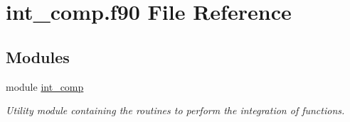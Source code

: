 \hypertarget{int__comp_8f90}{}\section{int\+\_\+comp.\+f90 File Reference}
\label{int__comp_8f90}
\subsection*{Modules}
\begin{DoxyCompactItemize}
\item 
module \hyperlink{namespaceint__comp}{int\+\_\+comp}
\begin{DoxyCompactList}\small\item\em Utility module containing the routines to perform the integration of functions. \end{DoxyCompactList}\end{DoxyCompactItemize}
